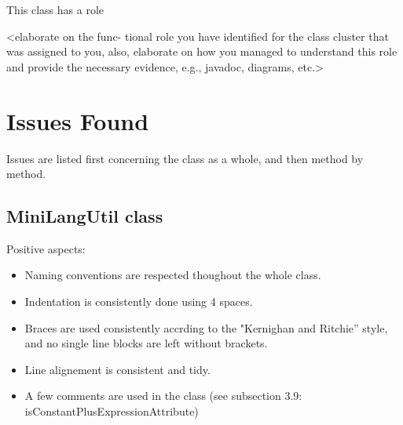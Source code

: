 \documentclass[11pt]{article} %
\begin{document}
This class has a role

 <elaborate on the func-
tional role you have identified for the class cluster that was assigned
to you, also, elaborate on how you managed to understand this role
and provide the necessary evidence, e.g., javadoc, diagrams, etc.>


\section{Issues Found}
Issues are listed first concerning the class as a whole, and then method by method.

\subsection{MiniLangUtil class}

Positive aspects:
\begin{itemize}[noitemsep]
	\item Naming conventions are respected thoughout the whole class.
	\item Indentation is consistently done using 4 spaces.
	\item Braces are used consistently accrding to the "Kernighan and Ritchie” style, and no single line blocks are left without brackets.
	\item Line alignement is consistent and tidy.
	\item A few comments are used in the class (see subsection 3.9: isConstantPlusExpressionAttribute)
	
\end{itemize}
\end{document}
